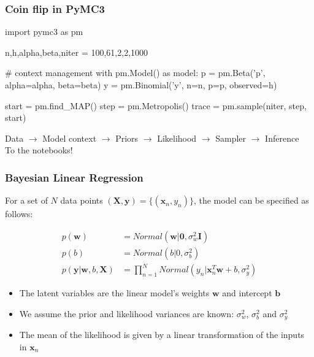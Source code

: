 \documentclass[table,dvipsnames]{beamer}
\begin{document}
\begin{frame}[fragile]
\frametitle{Coin flip in PyMC3}
\footnotesize
\begin{code}
import pymc3 as pm

n,h,alpha,beta,niter = 100,61,2,2,1000

# context management
with pm.Model() as model: 
    p = pm.Beta('p', alpha=alpha, beta=beta)
    y = pm.Binomial('y', n=n, p=p, observed=h)

    start = pm.find_MAP()
    step = pm.Metropolis()
    trace = pm.sample(niter, step, start)
\end{code}

Data $\rightarrow$ Model context $\rightarrow$ Priors $\rightarrow$ Likelihood $\rightarrow$ Sampler $\rightarrow$ Inference
\vspace{0.5cm}
\\ \noindent To the notebooks!
\end{frame}

\begin{frame}[fragile]
\frametitle{Bayesian Linear Regression}
\scriptsize
For a set of $N$ data points $(\mathbf{X},\mathbf{y})=\{(\mathbf{x}_n, y_n)\}$, the model can be specified as follows: 

\begin{align}
 p(\mathbf{w})                         &= Normal(\mathbf{w}|\mathbf{0},\sigma_{w}^{2} \mathbf{I})\\
 p(b)                                  &= Normal(b|0,\sigma^{2}_{b}) \\
 p(\mathbf{y}|\mathbf{w},b,\mathbf{X}) &= \prod^{N}_{n=1} Normal(y_{n}|\mathbf{x}_{n}^{T} \mathbf{w} + b,\sigma^{2}_{y})
\end{align}

\begin{itemize}
 \item The latent variables are the linear model’s weights $\mathbf{w}$ and intercept $\mathbf{b}$
 \item We assume the prior and likelihood variances are known: $\sigma_{w}^{2}$, $\sigma_{b}^{2}$ and $\sigma^{2}_{y}$
 \item The mean of the likelihood is given by a linear transformation of the inputs in $\mathbf{x}_{n}$
\end{itemize}
\citep{Murphy12}
\end{frame}
\end{document}
